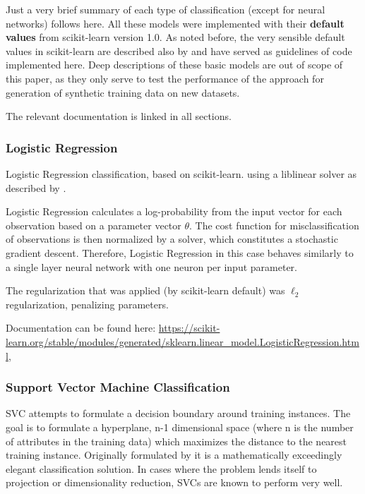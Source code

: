 Just a very brief summary of each type of classification (except for neural networks) follows here. All these models were implemented with their \textbf{default values} from scikit-learn version 1.0.
As noted before, the very sensible default values in scikit-learn are described also by \cite{buitinck2013api} and have served as guidelines of code implemented here.
Deep descriptions of these basic models are out of scope of this paper, as they only serve to test the performance of the approach for generation of synthetic training data on new datasets.

The relevant documentation is linked in all sections.

\clearpage

\subsubsection{Logistic Regression}

Logistic Regression classification, based on scikit-learn. 
using a liblinear solver as described by \cite{fan2008liblinear}.

Logistic Regression calculates a log-probability from the input vector for each observation based on a parameter vector $\theta$. 
The cost function for misclassification of observations is then normalized by a solver, which constitutes a stochastic gradient descent. 
Therefore, Logistic Regression in this case behaves similarly to a single layer neural network with one neuron per input parameter.

The regularization that was applied (by scikit-learn default) was $\ell_2$ regularization, penalizing parameters.

Documentation can be found here: \url{https://scikit-learn.org/stable/modules/generated/sklearn.linear_model.LogisticRegression.html},

\subsubsection{Support Vector Machine Classification}

\ac{SVC} attempts to formulate a decision boundary around training instances. The goal is to formulate a hyperplane, n-1 dimensional space (where n is the number of attributes in the training data) 
which maximizes the distance to the nearest training instance. 
Originally formulated by \cite{vapnik1995support} it is a mathematically exceedingly elegant classification solution. In cases where the problem lends itself to projection or dimensionality reduction,
\acp{SVC} are known to perform very well.

